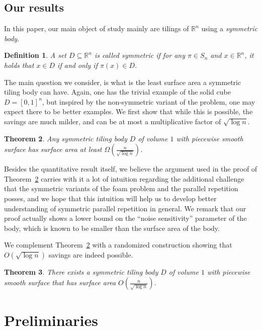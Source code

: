 \documentclass[10pt,a4paper]{article}
\newtheorem{thm}{Theorem}
\newtheorem{definition}[thm]{Definition}
\begin{document}
\setcounter{thm}{3}\setcounter{subsection}{2}\subsection{Our results}
In this paper, our main object of study mainly are tilings of $\mathbb{R}^n$ using a \emph{symmetric body}.
\begin{definition}
  A set $D\subseteq\mathbb{R}^n$ is called symmetric if
  for any $\pi\in S_n$ and $x\in\mathbb{R}^n$, it holds that
  $x\in D$ if and only if $\pi(x)\in D$.
\end{definition}

The main question we consider, is what is the least surface area a symmetric tiling body can have.
Again, one has the trivial example of the solid cube $D = [0,1]^n$, but inspired by the non-symmetric
variant of the problem, one may expect there to be better examples. We first show that while this is
possible, the savings are much milder, and can be at most a multiplicative factor of $\sqrt{\log n}$.
\begin{thm}\label{thm:lb}
	Any symmetric tiling body $D$ of volume $1$
	with piecewise smooth surface has surface area at least $\Omega\left(\frac{n}{\sqrt{\log n}}\right)$.
\end{thm}

Besides the quantitative result itself, we believe the argument used in the proof of Theorem~\ref{thm:lb}
carries with it a lot of intuition regarding the additional challenge that the symmetric variants of the foam problem
and the parallel repetition posses, and we hope that this intuition will help us to develop better understanding
of symmetric parallel repetition in general. We remark that our proof actually shows a lower bound on the ``noise sensitivity''
parameter of the body, which is known to be smaller than the surface area of the body.

We complement Theorem~\ref{thm:lb} with a randomized construction showing that $O(\sqrt{\log n})$ savings
are indeed possible.

\begin{thm}\label{thm:ub}
	There exists a symmetric tiling body $D$ of volume $1$
	with piecewise smooth surface that has surface area $O\left(\frac{n}{\sqrt{\log n}}\right)$.
\end{thm}

\setcounter{thm}{8}\section{Preliminaries}\label{sec:prelim}
\end{document}
